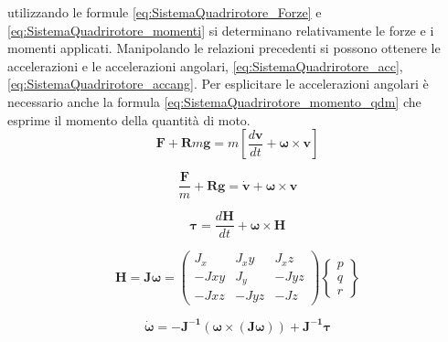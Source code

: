 utilizzando le formule \ref{eq:SistemaQuadrirotore_Forze} e \ref{eq:SistemaQuadrirotore_momenti} si determinano relativamente le forze e i momenti applicati. Manipolando le relazioni precedenti si possono ottenere le accelerazioni e le accelerazioni angolari, \ref{eq:SistemaQuadrirotore_acc}, \ref{eq:SistemaQuadrirotore_accang}. Per esplicitare le accelerazioni angolari è necessario anche la formula \ref{eq:SistemaQuadrirotore_momento_qdm} che esprime il momento della quantità di moto.
\begin{equation}\label{eq:SistemaQuadrirotore_Forze}
	\mathbf{F} + \mathbf{R} m \mathbf{g} = m \left[\frac{d \mathbf{v}}{d t} + \boldsymbol{\omega}\times \mathbf{v}\right]
\end{equation}

\begin{equation}\label{eq:SistemaQuadrirotore_acc}
	\frac{\mathbf{F}}{m} + \mathbf{R} \mathbf{g} = \mathbf{\dot{v}} + \boldsymbol{\omega} \times \mathbf{v}
\end{equation}

\begin{equation}\label{eq:SistemaQuadrirotore_momenti}
	\boldsymbol{\tau} = \frac{d \mathbf{H}}{d t } + \boldsymbol{\omega} \times \mathbf{H}
\end{equation}

\begin{equation}\label{eq:SistemaQuadrirotore_momento_qdm}
	\mathbf{H} = \mathbf{J} \boldsymbol{\omega} =
	\begin{pmatrix}
		J_x & J_xy & J_xz \\
		-Jxy & J_y & -Jyz \\
		-Jxz & -Jyz & -Jz 
	\end{pmatrix}
	\begin{Bmatrix}
		p\\
		q\\
		r
	\end{Bmatrix}
\end{equation}

\begin{equation}\label{eq:SistemaQuadrirotore_accang}
	\boldsymbol{\dot{\omega}} = - \mathbf{J^{-1}}\left(\boldsymbol{\omega}\times\left(\mathbf{J}\boldsymbol{\omega}\right)\right) + \mathbf{J^{-1}}\boldsymbol{\tau}
\end{equation}

